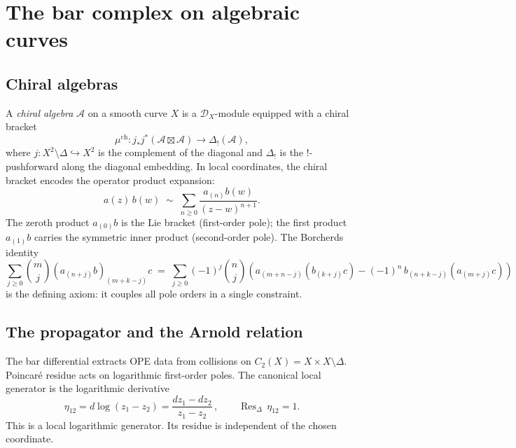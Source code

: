 \documentclass[11pt]{article}
\theoremstyle{plain}
\theoremstyle{definition}
\theoremstyle{remark}
\newcommand{\cA}{\mathcal{A}}
\newcommand{\cD}{\mathcal{D}}
\newcommand{\Res}{\operatorname{Res}}
\begin{document}

\section{The bar complex on algebraic curves}
\label{sec:bar-complex}

\subsection{Chiral algebras}

A \emph{chiral algebra} $\cA$ on a smooth curve $X$
\cite{BD04} is a $\cD_X$-module equipped with a chiral bracket
\begin{equation}\label{eq:chiral-bracket}
\mu^{\mathrm{ch}} \colon
j_* j^*(\cA \boxtimes \cA)
\longrightarrow
\Delta_!(\cA),
\end{equation}
where $j \colon X^2 \setminus \Delta \hookrightarrow X^2$ is the
complement of the diagonal and $\Delta_!$ is the $!$-pushforward
along the diagonal embedding. In local coordinates, the chiral
bracket encodes the operator product expansion:
\[
a(z)\,b(w) \;\sim\;
\sum_{n \geq 0} \frac{a_{(n)}b(w)}{(z-w)^{n+1}}.
\]
The zeroth product $a_{(0)}b$ is the Lie bracket (first-order
pole); the first product $a_{(1)}b$ carries the symmetric inner
product (second-order pole). The Borcherds identity
\begin{equation}\label{eq:borcherds}
\sum_{j \geq 0} \binom{m}{j}
(a_{(n+j)}b)_{(m+k-j)}c
\;=\;
\sum_{j \geq 0} (-1)^j \binom{n}{j}
\left(
a_{(m+n-j)}(b_{(k+j)}c)
- (-1)^n\, b_{(n+k-j)}(a_{(m+j)}c)
\right)
\end{equation}
is the defining axiom: it couples all pole orders in a single
constraint.

\subsection{The propagator and the Arnold relation}

The bar differential extracts OPE data from collisions
on $C_2(X) = X \times X \setminus \Delta$.  Poincar\'e residue acts
on logarithmic first-order poles.  The canonical local generator is
the logarithmic derivative
\[
\eta_{12} = d\log(z_1 - z_2)
= \frac{dz_1 - dz_2}{z_1 - z_2}\,,
\qquad \Res_\Delta\, \eta_{12} = 1.
\]
This is a local logarithmic generator.  Its residue is independent of
the chosen coordinate.
\end{document}
